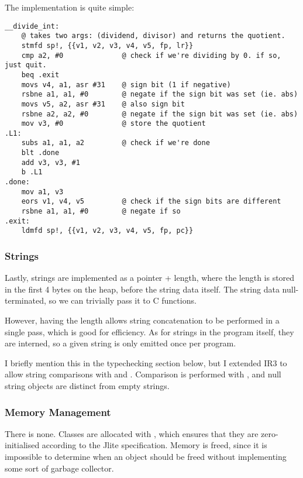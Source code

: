 \documentclass[12pt]{article}
\begin{document}
The implementation is quite simple:

\begin{verbatim}
__divide_int:
	@ takes two args: (dividend, divisor) and returns the quotient.
	stmfd sp!, {{v1, v2, v3, v4, v5, fp, lr}}
	cmp a2, #0              @ check if we're dividing by 0. if so, just quit.
	beq .exit
	movs v4, a1, asr #31    @ sign bit (1 if negative)
	rsbne a1, a1, #0        @ negate if the sign bit was set (ie. abs)
	movs v5, a2, asr #31    @ also sign bit
	rsbne a2, a2, #0        @ negate if the sign bit was set (ie. abs)
	mov v3, #0              @ store the quotient
.L1:
	subs a1, a1, a2         @ check if we're done
	blt .done
	add v3, v3, #1
	b .L1
.done:
	mov a1, v3
	eors v1, v4, v5         @ check if the sign bits are different
	rsbne a1, a1, #0        @ negate if so
.exit:
	ldmfd sp!, {{v1, v2, v3, v4, v5, fp, pc}}
\end{verbatim}



\subsubsection{Strings}

Lastly, strings are implemented as a pointer + length, where the length is stored in the first 4 bytes on the heap,
before the string data itself. The string data  null-terminated, so we can trivially pass it to C functions.

However, having the length allows string concatenation to be performed in a single pass, which is good for efficiency.
As for strings in the program itself, they are interned, so a given string is only emitted once per program.

I briefly mention this in the typechecking section below, but I extended IR3 to allow string comparisons with \eqtt{==}
and \eqtt{!=}. Comparison is performed with , and null string objects are distinct from empty strings.




\subsubsection{Memory Management}

There is none. Classes are allocated with , which ensures that they are zero-initialised according to the
Jlite specification. Memory is  freed, since it is impossible to determine when an object should be freed
without implementing some sort of garbage collector.
\end{document}
